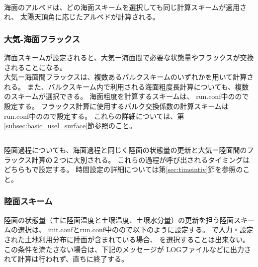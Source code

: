 \\

海面のアルベドは、どの海面スキームを選択しても同じ計算スキームが適用され、
太陽天頂角に応じたアルベドが計算される。\\


\subsubsection{大気-海面フラックス}
海面スキームが設定されると、大気ー海面間で必要な状態量やフラックスが交換されることになる。\\
大気ー海面間フラックスは、複数あるバルクスキームのいずれかを用いて計算される。
また、バルクスキーム内で利用される海面粗度長計算についても、複数のスキームが選択できる。
海面粗度を計算するスキームは、
run.conf中のので設定する。
フラックス計算に使用するバルク交換係数の計算スキームは
run.conf中のので設定する。
これらの詳細については、第\ref{subsec:basic_usel_surface}節参照のこと。\\



\subsection{\SubsecLandSetting} \label{subsec:basic_usel_land}
陸面過程についても、海面過程と同じく陸面の状態量の更新と大気ー陸面間のフラックス計算の２つに大別される。
これらの過程が呼び出されるタイミングはどちらもで設定する。
時間設定の詳細については第\ref{sec:timeintiv}節を参照のこと。\\


\subsubsection{陸面スキーム}
陸面の状態量（主に陸面温度と土壌温度、土壌水分量）の更新を担う陸面スキームの選択は、
init.confとrun.conf中のので以下のように設定する。
で入力・設定された土地利用分布に陸面が含まれている場合、
を選択することは出来ない。この条件を満たさない場合は、下記のメッセージが
LOGファイルなどに出力されて計算は行われず、直ちに終了する。

